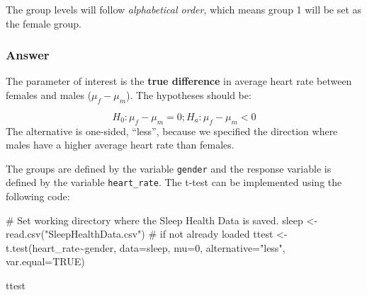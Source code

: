 \documentclass[
  letterpaper,
  DIV=11,
  numbers=noendperiod]{scrartcl}
\newenvironment{Shaded}{\begin{snugshade}}{\end{snugshade}}
\newcommand{\AttributeTok}[1]{\textcolor[rgb]{0.40,0.45,0.13}{#1}}
\newcommand{\CommentTok}[1]{\textcolor[rgb]{0.37,0.37,0.37}{#1}}
\newcommand{\ConstantTok}[1]{\textcolor[rgb]{0.56,0.35,0.01}{#1}}
\newcommand{\DecValTok}[1]{\textcolor[rgb]{0.68,0.00,0.00}{#1}}
\newcommand{\FunctionTok}[1]{\textcolor[rgb]{0.28,0.35,0.67}{#1}}
\newcommand{\NormalTok}[1]{\textcolor[rgb]{0.00,0.23,0.31}{#1}}
\newcommand{\OtherTok}[1]{\textcolor[rgb]{0.00,0.23,0.31}{#1}}
\newcommand{\SpecialCharTok}[1]{\textcolor[rgb]{0.37,0.37,0.37}{#1}}
\newcommand{\StringTok}[1]{\textcolor[rgb]{0.13,0.47,0.30}{#1}}
\begin{document}
\begin{tcolorbox}[enhanced jigsaw, bottomtitle=1mm, colback=white, opacityback=0, leftrule=.75mm, opacitybacktitle=0.6, coltitle=black, left=2mm, colframe=quarto-callout-warning-color-frame, toptitle=1mm, colbacktitle=quarto-callout-warning-color!10!white, titlerule=0mm, title=\textcolor{quarto-callout-warning-color}{\faExclamationTriangle}\hspace{0.5em}{Warning}, arc=.35mm, rightrule=.15mm, breakable, bottomrule=.15mm, toprule=.15mm]

The group levels will follow \emph{alphabetical order}, which means
group 1 will be set as the female group.

\end{tcolorbox}

\subsubsection{Answer}

The parameter of interest is the \textbf{true difference} in average
heart rate between females and males (\(\mu_f-\mu_m\)). The hypotheses
should be:

\[
H_0: \mu_f - \mu_m = 0; H_a: \mu_f - \mu_m < 0
\] The alternative is one-sided, ``less'', because we specified the
direction where males have a higher average heart rate than females.

The groups are defined by the variable \texttt{gender} and the response
variable is defined by the variable \texttt{heart\_rate}. The t-test can
be implemented using the following code:

\begin{Shaded}
\begin{Highlighting}[]
\CommentTok{\# Set working directory where the Sleep Health Data is saved.}
\NormalTok{sleep }\OtherTok{\textless{}{-}} \FunctionTok{read.csv}\NormalTok{(}\StringTok{"SleepHealthData.csv"}\NormalTok{) }\CommentTok{\# if not already loaded}
\NormalTok{ttest }\OtherTok{\textless{}{-}} \FunctionTok{t.test}\NormalTok{(heart\_rate}\SpecialCharTok{\textasciitilde{}}\NormalTok{gender,}
                \AttributeTok{data=}\NormalTok{sleep,}
                \AttributeTok{mu=}\DecValTok{0}\NormalTok{,}
                \AttributeTok{alternative=}\StringTok{"less"}\NormalTok{,}
                \AttributeTok{var.equal=}\ConstantTok{TRUE}\NormalTok{)}

\NormalTok{ttest}
\end{Highlighting}
\end{Shaded}
\end{document}
